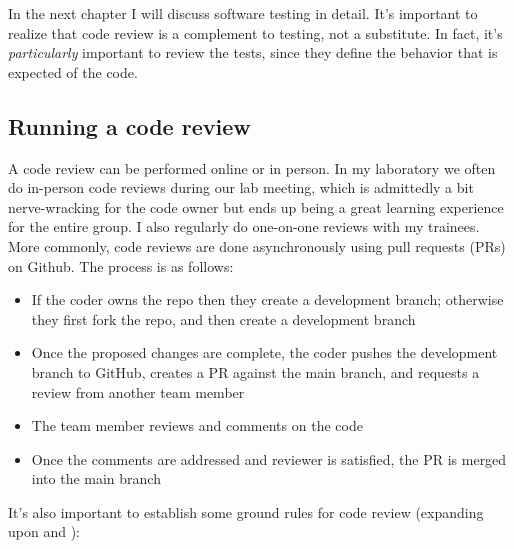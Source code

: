 In the next chapter I will discuss software testing in detail.  It's important to realize that code review is a complement to testing, not a substitute.  In fact, it's \textit{particularly} important to review the tests, since they define the behavior that is expected of the code.

\subsection{Running a code review}

A code review can be performed online or in person.  In my laboratory we often do in-person code reviews during our lab meeting, which is admittedly a bit nerve-wracking for the code owner but ends up being a great learning experience for the entire group. I also regularly do one-on-one reviews with my trainees. More commonly, code reviews are done asynchronously using pull requests (PRs) on Github.  The process is as follows:

\begin{itemize}
\item If the coder owns the repo then they create a development branch; otherwise they first fork the repo, and then create a development branch
\item Once the proposed changes are complete, the coder pushes the development branch to GitHub, creates a PR against the main branch, and requests a review from another team member
\item The team member reviews and comments on the code
\item Once the comments are addressed and reviewer is satisfied, the PR is merged into the main branch
\end{itemize}

It's also important to establish some ground rules for code review (expanding upon \citep{petre:2014} and \citep{Rokem:2024aa}):

